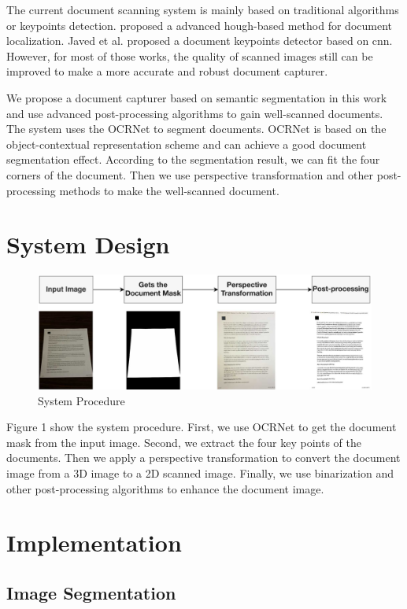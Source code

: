 \documentclass[10pt, conference, compsocconf]{IEEEtran}
\begin{document}
The current document scanning system is mainly based on traditional algorithms or keypoints detection.  \cite{Tropin2021AdvancedHM} proposed a advanced hough-based method for document localization. Javed et al.\cite{javed2017real} proposed a document keypoints detector based on cnn.
However, for most of those works, the quality of scanned images still can be improved to make a more accurate and robust document capturer.

We propose a document capturer based on semantic segmentation in this work and use advanced post-processing algorithms to gain well-scanned documents.
The system uses the OCRNet\cite{yuan2020object} to segment documents. 
OCRNet is based on the object-contextual representation scheme and can achieve a good document segmentation effect. According to the segmentation result, we can fit the four corners of the document. Then we use perspective transformation\cite{lin2010image} and other post-processing methods to make the well-scanned document.

\section{System Design}

\begin{figure}[!h]
\centering
\includegraphics[width=3.2 in]{./Assets/FlowChart.jpg}
\caption{System Procedure}
\end{figure}



Figure 1 show the system procedure.
First, we use OCRNet\cite{yuan2020object} to get the document mask from the input image.
Second, we extract the four key points of the documents.
Then we apply a perspective transformation to convert the document image from a 3D image to a 2D scanned image.
Finally, we use binarization and other post-processing algorithms to enhance the document image. 

\section{Implementation}

\subsection{Image Segmentation}
\end{document}
